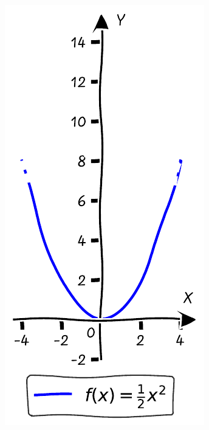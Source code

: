 \documentclass[nobib]{tufte-handout}
\begin{document}
\begin{figure}[h]
\begin{minipage}{0.19\textwidth}
  \end{minipage}\hfill
  \begin{minipage}{0.19\textwidth}
    \includegraphics[width=\linewidth]{./graphs/quadratic_func_shrink_2.pdf}

\end{minipage}
\end{figure}
\end{document}
